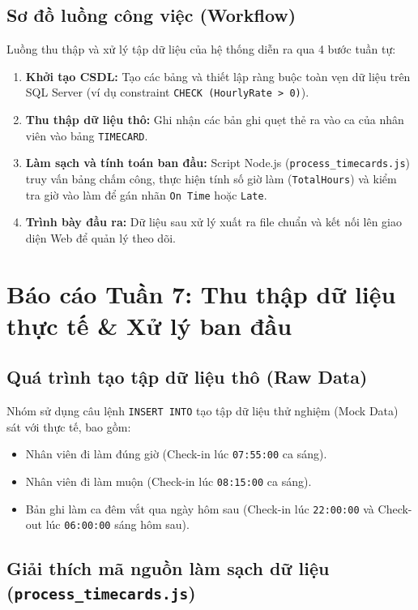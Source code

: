 \documentclass[12pt,a4paper]{article}
\begin{document}
\subsection{Sơ đồ luồng công việc (Workflow)}
Luồng thu thập và xử lý tập dữ liệu của hệ thống diễn ra qua 4 bước tuần tự:
\begin{enumerate}
    \item \textbf{Khởi tạo CSDL:} Tạo các bảng và thiết lập ràng buộc toàn vẹn dữ liệu trên SQL Server (ví dụ constraint \texttt{CHECK (HourlyRate > 0)}).
    \item \textbf{Thu thập dữ liệu thô:} Ghi nhận các bản ghi quẹt thẻ ra vào ca của nhân viên vào bảng \texttt{TIMECARD}.
    \item \textbf{Làm sạch và tính toán ban đầu:} Script Node.js (\texttt{process\_timecards.js}) truy vấn bảng chấm công, thực hiện tính số giờ làm (\texttt{TotalHours}) và kiểm tra giờ vào làm để gán nhãn \texttt{On Time} hoặc \texttt{Late}.
    \item \textbf{Trình bày đầu ra:} Dữ liệu sau xử lý xuất ra file chuẩn và kết nối lên giao diện Web để quản lý theo dõi.
\end{enumerate}

\section{Báo cáo Tuần 7: Thu thập dữ liệu thực tế \& Xử lý ban đầu}

\subsection{Quá trình tạo tập dữ liệu thô (Raw Data)}
Nhóm sử dụng câu lệnh \texttt{INSERT INTO} tạo tập dữ liệu thử nghiệm (Mock Data) sát với thực tế, bao gồm:
\begin{itemize}
    \item Nhân viên đi làm đúng giờ (Check-in lúc \texttt{07:55:00} ca sáng).
    \item Nhân viên đi làm muộn (Check-in lúc \texttt{08:15:00} ca sáng).
    \item Bản ghi làm ca đêm vắt qua ngày hôm sau (Check-in lúc \texttt{22:00:00} và Check-out lúc \texttt{06:00:00} sáng hôm sau).
\end{itemize}

\subsection{Giải thích mã nguồn làm sạch dữ liệu (\texttt{process\_timecards.js})}
\end{document}
